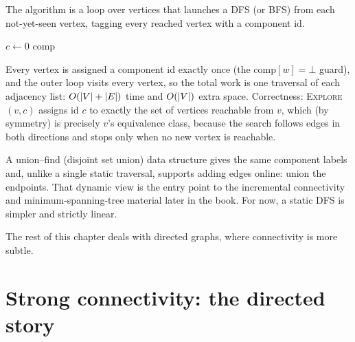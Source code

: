 The algorithm is a loop over vertices that launches a DFS (or BFS) from each not-yet-seen vertex, tagging every reached vertex with a component id.

\begin{algorithm}[H]
\caption{Connected components of an undirected graph}
\label{ch05:alg-cc}
\DontPrintSemicolon
{}
$c \gets 0$\;
\Return $\mathrm{comp}$\;
\BlankLine
{}
\end{algorithm}

\begin{whybox}
Every vertex is assigned a component id exactly once (the $\mathrm{comp}[w]=\bot$ guard), and the outer loop visits every vertex, so the total work is one traversal of each adjacency list: $O(\lvert V\rvert+\lvert E\rvert)$ time and $O(\lvert V\rvert)$ extra space. Correctness: \textsc{Explore}$(v,c)$ assigns id $c$ to exactly the set of vertices reachable from $v$, which (by symmetry) is precisely $v$'s equivalence class, because the search follows edges in both directions and stops only when no new vertex is reachable.
\end{whybox}

\begin{connectionbox}
A union--find (disjoint set union) data structure gives the same component labels and, unlike a single static traversal, supports adding edges online: union the endpoints. That dynamic view is the entry point to the incremental connectivity and minimum-spanning-tree material later in the book. For now, a static DFS is simpler and strictly linear.
\end{connectionbox}

The rest of this chapter deals with directed graphs, where connectivity is more subtle.

\section{Strong connectivity: the directed story}
\label{ch05:strong}

